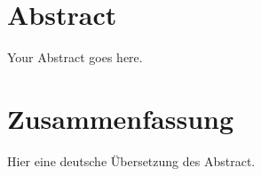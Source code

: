 \section*{Abstract}
Your Abstract goes here.

\newpage
\section*{Zusammenfassung}
Hier eine deutsche Übersetzung des Abstract.

